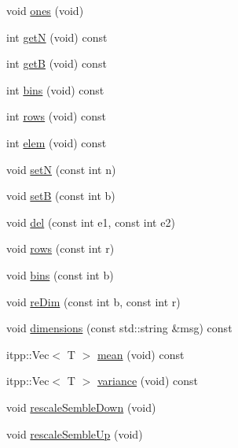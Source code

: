 \begin{DoxyCompactItemize}
\item 
void \mbox{\hyperlink{structSEMBLE_1_1SembleVector_aebc4ff68f93d72431d206ba9bcbb78fb}{ones}} (void)
\item 
int \mbox{\hyperlink{structSEMBLE_1_1SembleVector_aef7c2b90fc42f7d3a9dadf6e00f18add}{getN}} (void) const
\item 
int \mbox{\hyperlink{structSEMBLE_1_1SembleVector_a30ac55c6514b63443ad073ccc4913051}{getB}} (void) const
\item 
int \mbox{\hyperlink{structSEMBLE_1_1SembleVector_a5820189cbbd205f6a7e134c0879b993b}{bins}} (void) const
\item 
int \mbox{\hyperlink{structSEMBLE_1_1SembleVector_a2d225b0e49bb4b0c1c9fd3f9202a48e5}{rows}} (void) const
\item 
int \mbox{\hyperlink{structSEMBLE_1_1SembleVector_a4054d66d607dbedd52f2d11cd9d1086c}{elem}} (void) const
\item 
void \mbox{\hyperlink{structSEMBLE_1_1SembleVector_a7ca12dcc693c8395ddd4ec544330db82}{setN}} (const int n)
\item 
void \mbox{\hyperlink{structSEMBLE_1_1SembleVector_a9f30d2d19ce553c89a695905f770a3d4}{setB}} (const int b)
\item 
void \mbox{\hyperlink{structSEMBLE_1_1SembleVector_a50da934be7c3c32c09b2ab8454a9c1b5}{del}} (const int e1, const int e2)
\item 
void \mbox{\hyperlink{structSEMBLE_1_1SembleVector_ab123cb720f7df7ec85a288ea2e8c8338}{rows}} (const int r)
\item 
void \mbox{\hyperlink{structSEMBLE_1_1SembleVector_ab899172400d619e7564ac483945e5578}{bins}} (const int b)
\item 
void \mbox{\hyperlink{structSEMBLE_1_1SembleVector_a145668e54bc3ebd9a47e7bfd2646947a}{re\+Dim}} (const int b, const int r)
\item 
void \mbox{\hyperlink{structSEMBLE_1_1SembleVector_a17041e449089853ef9184a79c4cae67c}{dimensions}} (const std\+::string \&msg) const
\item 
itpp\+::\+Vec$<$ T $>$ \mbox{\hyperlink{structSEMBLE_1_1SembleVector_acb34740f7232e5d1bf079cf131192322}{mean}} (void) const
\item 
itpp\+::\+Vec$<$ T $>$ \mbox{\hyperlink{structSEMBLE_1_1SembleVector_a105aedbde26eb3678ee4721e2e38ceda}{variance}} (void) const
\item 
void \mbox{\hyperlink{structSEMBLE_1_1SembleVector_a749affd5efb20a00291f27bf034728cd}{rescale\+Semble\+Down}} (void)
\item 
void \mbox{\hyperlink{structSEMBLE_1_1SembleVector_aa9fbae5c5028eb49709043362099cb03}{rescale\+Semble\+Up}} (void)

\end{DoxyCompactItemize}
